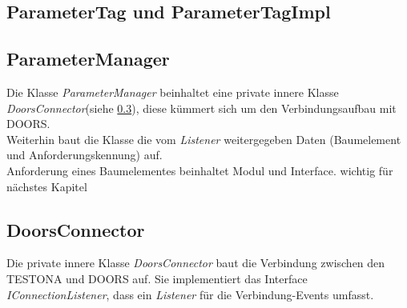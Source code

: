 \subsection{ParameterTag und ParameterTagImpl}\label{sub.ParameterTag}





\subsection{ParameterManager}\label{sub.ParameterManager}


Die Klasse \textit{ParameterManager} beinhaltet eine private innere Klasse \textit{DoorsConnector}(siehe \ref{sub.DoorsConn}), diese kümmert sich um den Verbindungsaufbau mit DOORS.\\ Weiterhin baut die Klasse die vom \textit{Listener} weitergegeben Daten (Baumelement und Anforderungskennung) auf.\\



Anforderung eines Baumelementes beinhaltet Modul und Interface. wichtig für nächstes Kapitel



\subsection{DoorsConnector}\label{sub.DoorsConn}


Die private innere Klasse \textit{DoorsConnector} baut die Verbindung zwischen den TESTONA und DOORS auf. Sie implementiert das Interface \textit{IConnectionListener}, dass ein \textit{Listener} für die Verbindung-Events umfasst.\\

